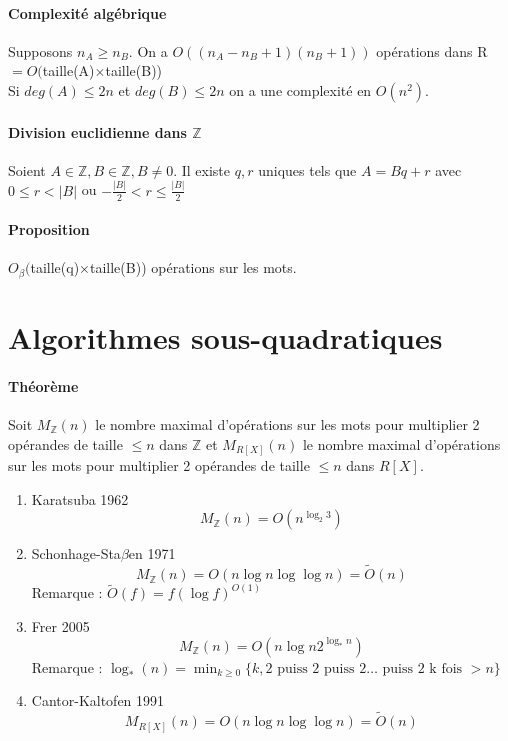 \documentclass[12pt,a4paper]{report}
\begin{document}
\paragraph{Complexité algébrique\\}
Supposons $n_A \geqslant n_B$.
On a $O((n_A-n_B+1)(n_B+1)) $ opérations dans R $ = O($taille(A)$\times$taille(B))\\
Si $deg(A) \leqslant 2n$ et $ deg(B) \leqslant 2n$ on a une complexité en $ O(n^2)$.
\paragraph{Division euclidienne dans $\mathbb{Z}$\\}
Soient $ A\in \mathbb{Z}, B \in \mathbb{Z}, B \neq 0$.
Il existe $ q,r $ uniques tels que $A=Bq+r$ avec $0 \leqslant r < |B|$ ou $-\frac{|B|}{2} < r \leqslant \frac{|B|}{2}$
\paragraph{Proposition\\}
$O_{\beta}($taille(q)$\times$taille(B)) opérations sur les mots.
\section{Algorithmes sous-quadratiques}
\paragraph{Théorème\\}
Soit $M_{\mathbb{Z}}(n)$ le nombre maximal d'opérations sur les mots pour multiplier 2 opérandes de taille $\leqslant n$ dans $\mathbb{Z}$ et $M_{R[X]}(n)$ le nombre maximal d'opérations sur les mots pour multiplier 2 opérandes de taille $\leqslant n$ dans $R[X]$.
\begin{enumerate}
\item Karatsuba 1962 
$$ M_{\mathbb{Z}}(n) = O(n^{\log_2 3})$$
\item Schonhage-Sta$\beta$en 1971 
$$ M_{\mathbb{Z}}(n)= O(n\log n\log \log n)=\tilde{O}(n)$$
Remarque : $\tilde{O}(f)=f(\log f)^{O(1)}$
\item Frer 2005
$$ M_{\mathbb{Z}}(n) = O(n \log n 2^{\log_* n})$$
Remarque : $ \displaystyle \log _* (n) = \min_{k \geqslant 0} \{ k, 2 \mbox{ puiss } 2\mbox{ puiss } 2 \ldots \mbox{ puiss } 2 \mbox{ k fois }  > n\}$
\item Cantor-Kaltofen 1991
$$ M_{R[X]}(n) = O(n \log n \log \log n) =\tilde{O}(n)$$
\end{enumerate}
\end{document}
